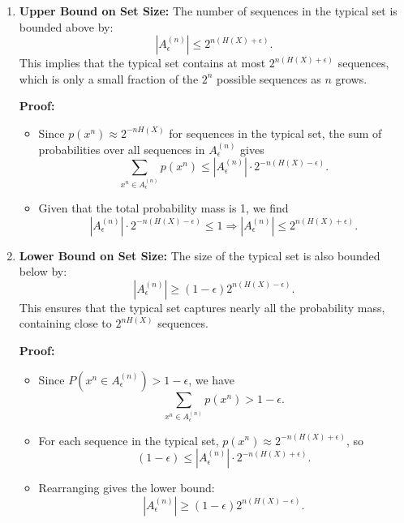 \begin{enumerate}
    \item \textbf{Upper Bound on Set Size:} The number of sequences in the typical set is bounded above by:
          \[
              |A^{(n)}_\epsilon| \leq 2^{n(H(X) + \epsilon)}.
          \]
          This implies that the typical set contains at most $2^{n(H(X) + \epsilon)}$ sequences, which is only a small fraction of the $2^n$ possible sequences as $n$ grows.

          \textbf{Proof:}
          \begin{itemize}
              \item Since $p(x^n) \approx 2^{-nH(X)}$ for sequences in the typical set, the sum of probabilities over all sequences in $A^{(n)}_\epsilon$ gives
                    \[
                        \sum_{x^n \in A^{(n)}_\epsilon} p(x^n) \leq |A^{(n)}_\epsilon| \cdot 2^{-n(H(X) - \epsilon)}.
                    \]
              \item Given that the total probability mass is 1, we find
                    \[
                        |A^{(n)}_\epsilon| \cdot 2^{-n(H(X) - \epsilon)} \leq 1 \Rightarrow |A^{(n)}_\epsilon| \leq 2^{n(H(X) + \epsilon)}.
                    \]
          \end{itemize}

    \item \textbf{Lower Bound on Set Size:} The size of the typical set is also bounded below by:
          \[
              |A^{(n)}_\epsilon| \geq (1 - \epsilon) 2^{n(H(X) - \epsilon)}.
          \]
          This ensures that the typical set captures nearly all the probability mass, containing close to $2^{nH(X)}$ sequences.

          \textbf{Proof:}
          \begin{itemize}
              \item Since $P(x^n \in A^{(n)}_\epsilon) > 1 - \epsilon$, we have
                    \[
                        \sum_{x^n \in A^{(n)}_\epsilon} p(x^n) > 1 - \epsilon.
                    \]
              \item For each sequence in the typical set, $p(x^n) \approx 2^{-n(H(X) + \epsilon)}$, so
                    \[
                        (1 - \epsilon) \leq |A^{(n)}_\epsilon| \cdot 2^{-n(H(X) + \epsilon)}.
                    \]
              \item Rearranging gives the lower bound:
                    \[
                        |A^{(n)}_\epsilon| \geq (1 - \epsilon) 2^{n(H(X) - \epsilon)}.
                    \]
          \end{itemize}
\end{enumerate}

